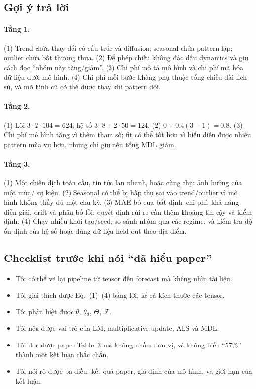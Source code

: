 \subsection*{Gợi ý trả lời}

\paragraph{Tầng 1.}
(1) Trend chứa thay đổi có cấu trúc và diffusion; seasonal chứa pattern lặp; outlier chứa bất thường
thưa. (2) Để phép chiếu không đảo dấu dynamics và giữ cách đọc ``nhóm này tăng/giảm''. (3) Chi phí
mô tả mô hình và chi phí mã hóa dữ liệu dưới mô hình. (4) Chi phí mỗi bước không phụ thuộc tổng
chiều dài lịch sử, và mô hình cũ có thể được thay khi pattern đổi.

\paragraph{Tầng 2.}
(1) Lõi $3\cdot2\cdot104=624$; hệ số $3\cdot8+2\cdot50=124$. (2)
$0+0.4(3-1)=0.8$. (3) Chi phí mô hình tăng vì thêm tham số; fit có thể tốt hơn vì biểu diễn được
nhiều pattern mùa vụ hơn, nhưng chỉ giữ nếu tổng MDL giảm.

\paragraph{Tầng 3.}
(1) Một chiến dịch toàn cầu, tin tức lan nhanh, hoặc cùng chịu ảnh hưởng của một mùa/ sự kiện.
(2) Seasonal có thể bị hấp thụ sai vào trend/outlier vì mô hình không thấy đủ một chu kỳ.
(3) MAE bỏ qua bất định, chi phí, khả năng diễn giải, drift và phân bố lỗi; quyết định rủi ro cần
thêm khoảng tin cậy và kiểm định. (4) Chạy nhiều khởi tạo/seed, so sánh nhóm qua các regime, và
kiểm tra độ ổn định của hệ số hoặc dùng dữ liệu held-out theo địa điểm.

\subsection*{Checklist trước khi nói ``đã hiểu paper''}

\begin{itemize}
  \item Tôi có thể vẽ lại pipeline từ tensor đến forecast mà không nhìn tài liệu.
  \item Tôi giải thích được Eq.~(1)--(4) bằng lời, kể cả kích thước các tensor.
  \item Tôi phân biệt được $\theta$, $\theta_d$, $\Theta$, $\mathcal{F}$.
  \item Tôi nêu được vai trò của LM, multiplicative update, ALS và MDL.
  \item Tôi đọc được paper Table~3 mà không nhầm đơn vị, và không biến ``57\%'' thành một kết luận chắc chắn.
  \item Tôi nói rõ được ba điều: kết quả paper, giả định của mô hình, và giới hạn của kết luận.
\end{itemize}
